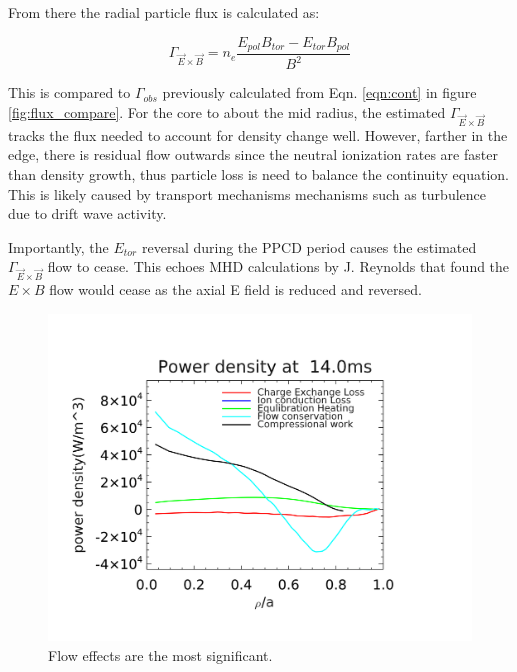 \documentclass[aip, pop, preprint]{revtex4-1}
\begin{document}
From there the radial particle flux is calculated as:

\begin{equation}
\Gamma_{\vec{E} \times \vec{B}} = n_{e} \frac{E_{pol}B_{tor} - E_{tor}B_{pol}}{B^2}
\end{equation}

This is compared to $\Gamma_{obs}$ previously calculated from Eqn. \ref{eqn:cont} in figure \ref{fig:flux_compare}. For the core to about the
mid radius, the estimated $\Gamma_{\vec{E} \times \vec{B}}$ tracks the flux
needed to account for density change well. However, farther in the edge, there
is residual flow outwards since the neutral ionization rates are faster than
density growth, thus particle loss is need to balance the continuity equation.
This is likely caused by transport mechanisms mechanisms such as turbulence due to
drift wave activity\cite{Duff2018ObservationPlasmas,Williams2017TurbulencePinch,NishizawaPRLSubmitted}.

Importantly, the $ E_{tor} $ reversal during the PPCD period causes the
estimated $ \Gamma_{\vec{E} \times \vec{B}} $ flow to cease. This echoes MHD
calculations by J. Reynolds that found the $ E \times B $ flow would cease as
the axial E field is reduced and reversed\cite{ReynoldsThesis}.

\begin{figure}
	\centering
	\includegraphics[width=1.\columnwidth]{./plots/dedt_june18-1.png}
	\caption{Flow effects are the most significant.\label{fig:dedt_plot}}
\end{figure}
\end{document}
